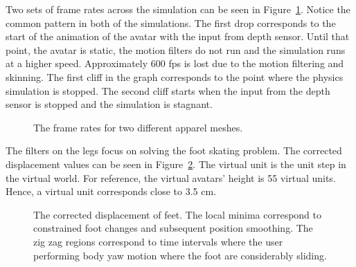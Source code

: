 \documentclass[number,preprint,review,12pt]{elsarticle}
\begin{document}
Two sets of frame rates across the simulation can be seen in Figure~\ref{fig:fps}. Notice the common pattern in both of the simulations. The first drop corresponds to the start of the animation of the avatar with the input from depth sensor. Until that point, the avatar is static, the motion filters do not run and the simulation runs at a higher speed. Approximately 600 fps is lost due to the motion filtering and skinning. The first cliff in the graph corresponds to the point where the physics simulation is stopped. The second cliff starts when the input from the depth sensor is stopped and the simulation is stagnant.  

\begin{figure}[htbp]
	\begin{center} 
	\end{center}
	\caption{The frame rates for two different apparel meshes. }
	\label{fig:fps}
\end{figure}

The filters on the legs focus on solving the foot skating problem. The corrected displacement values can be seen in Figure~\ref{fig:footskating}. The virtual unit is the unit step in the virtual world. For reference, the virtual avatars' height is 55 virtual units. Hence, a virtual unit corresponds close to 3.5 cm.  

\begin{figure}[htbp] 
	\begin{center} 
	\end{center}
	\caption{The corrected displacement of feet. The local minima correspond to constrained foot changes and subsequent 
	position smoothing. The zig zag regions correspond to time intervals where the user performing body yaw motion where 
	the foot are considerably sliding.}
	\label{fig:footskating}
\end{figure}
\end{document}
